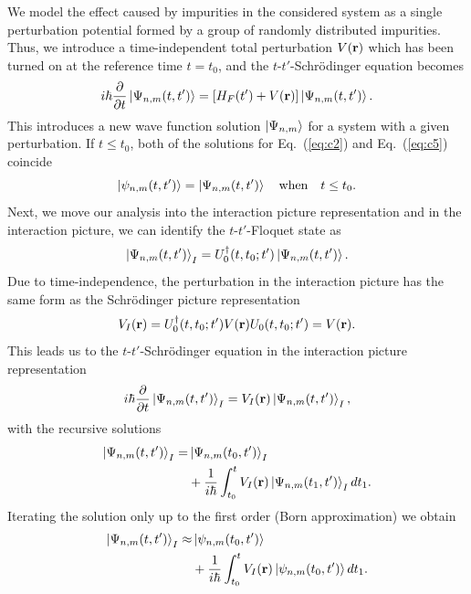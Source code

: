 \documentclass[
 reprint,
 amsmath,amssymb,
 aps,
 prb,
]{revtex4-2}
\begin{document}
We model the effect caused by impurities in the considered system as a single perturbation potential formed by a group of randomly distributed impurities.
Thus, we introduce a time-independent total perturbation $V(\vb{r})$ which has been turned on at the reference time $t=t_0$, and the $t$-$t'$-Schrödinger equation becomes
\begin{equation} \label{eq:c5}
  i \hbar \pdv{t}\ket{\Psi_{n,m}(t,t')} =
  \left[H_F(t') + V(\vb{r}) \right]\ket{\Psi_{n,m}(t,t')}.
\end{equation}
This introduces a new wave function solution $\ket{\Psi_{n,m}}$ for a system with a given perturbation. If $t\leq t_0$, both of the solutions for Eq.~(\ref{eq:c2}) and Eq.~(\ref{eq:c5}) coincide
\begin{equation} \label{eq:c6}
  \ket{\psi_{n,m}(t,t')} =\ket{\Psi_{n,m}(t,t')} \quad
  \text{when} \quad
  t \leq t_0.
\end{equation}
Next, we move our analysis into the interaction picture representation \cite{bruus04,mahan00} and in the interaction picture, we can identify the $t$-$t'$-Floquet state as
\begin{equation} \label{eq:c7}
  \ket{\Psi_{n,m}(t,t')}_I = U_0^{\dagger}(t,t_0;t')
  \ket{\Psi_{n,m}(t,t')}.
\end{equation}
Due to time-independence, the perturbation in the interaction picture has the same form as the Schrödinger picture representation
\begin{equation} \label{eq:c8}
  V_I(\vb{r}) = U_0^{\dagger}(t,t_0;t')V(\vb{r})U_0(t,t_0;t') =
  V(\vb{r}).
\end{equation}
This leads us to the $t$-$t'$-Schrödinger equation in the interaction picture representation
\begin{equation} \label{eq:c9}
  i \hbar \pdv{t}\ket{\Psi_{n,m}(t,t')}_I =
  V_I(\vb{r})\ket{\Psi_{n,m}(t,t')}_I,
\end{equation}
with the recursive solutions \cite{bruus04,mahan00}
\begin{equation} \label{eq:c10}
  \begin{aligned}
  \ket{\Psi_{n,m}(t,t')}_I = &\ket{\Psi_{n,m}(t_0,t')}_I \\
  &+
  \frac{1}{i\hbar}
  \int_{t_0}^t
  V_I(\vb{r}) \ket{\Psi_{n,m}(t_1,t')}_I dt_1.
  \end{aligned}
\end{equation}
Iterating the solution only up to the first order (Born approximation) we obtain
\begin{equation} \label{eq:c11}
  \begin{aligned}
    \ket{\Psi_{n,m}(t,t')}_I \approx &\ket{\psi_{n,m}(t_0,t')} \\
    &+
    \frac{1}{i\hbar}
    \int_{t_0}^t
    V_I(\vb{r}) \ket{\psi_{n,m}(t_0,t')} dt_1.
  \end{aligned}
\end{equation}
\end{document}
